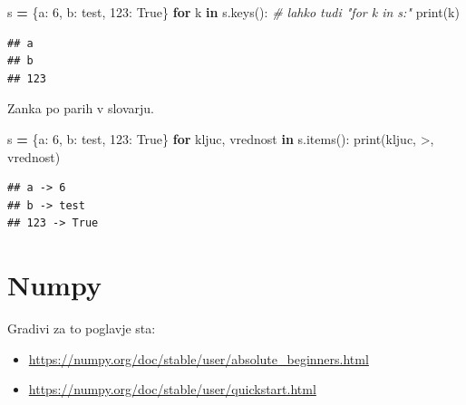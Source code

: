 \documentclass[
]{report}
\newenvironment{Shaded}{\begin{snugshade}}{\end{snugshade}}
\newcommand{\BuiltInTok}[1]{#1}
\newcommand{\CommentTok}[1]{\textcolor[rgb]{0.56,0.35,0.01}{\textit{#1}}}
\newcommand{\ControlFlowTok}[1]{\textcolor[rgb]{0.13,0.29,0.53}{\textbf{#1}}}
\newcommand{\DecValTok}[1]{\textcolor[rgb]{0.00,0.00,0.81}{#1}}
\newcommand{\KeywordTok}[1]{\textcolor[rgb]{0.13,0.29,0.53}{\textbf{#1}}}
\newcommand{\NormalTok}[1]{#1}
\newcommand{\OperatorTok}[1]{\textcolor[rgb]{0.81,0.36,0.00}{\textbf{#1}}}
\newcommand{\StringTok}[1]{\textcolor[rgb]{0.31,0.60,0.02}{#1}}
\newcommand{\VariableTok}[1]{\textcolor[rgb]{0.00,0.00,0.00}{#1}}
\providecommand{\tightlist}{%
  \setlength{\itemsep}{0pt}\setlength{\parskip}{0pt}}
\begin{document}
\begin{Shaded}
\begin{Highlighting}[]
\NormalTok{s }\OperatorTok{=}\NormalTok{ \{}\StringTok{\textquotesingle{}a\textquotesingle{}}\NormalTok{: }\DecValTok{6}\NormalTok{, }\StringTok{\textquotesingle{}b\textquotesingle{}}\NormalTok{: }\StringTok{\textquotesingle{}test\textquotesingle{}}\NormalTok{, }\DecValTok{123}\NormalTok{: }\VariableTok{True}\NormalTok{\}}
\ControlFlowTok{for}\NormalTok{ k }\KeywordTok{in}\NormalTok{ s.keys(): }\CommentTok{\# lahko tudi "for k in s:"}
    \BuiltInTok{print}\NormalTok{(k)}
\end{Highlighting}
\end{Shaded}

\begin{verbatim}
## a
## b
## 123
\end{verbatim}

Zanka po parih v slovarju.

\begin{Shaded}
\begin{Highlighting}[]
\NormalTok{s }\OperatorTok{=}\NormalTok{ \{}\StringTok{\textquotesingle{}a\textquotesingle{}}\NormalTok{: }\DecValTok{6}\NormalTok{, }\StringTok{\textquotesingle{}b\textquotesingle{}}\NormalTok{: }\StringTok{\textquotesingle{}test\textquotesingle{}}\NormalTok{, }\DecValTok{123}\NormalTok{: }\VariableTok{True}\NormalTok{\}}
\ControlFlowTok{for}\NormalTok{ kljuc, vrednost }\KeywordTok{in}\NormalTok{ s.items():}
    \BuiltInTok{print}\NormalTok{(kljuc, }\StringTok{\textquotesingle{}{-}\textgreater{}\textquotesingle{}}\NormalTok{, vrednost)}
\end{Highlighting}
\end{Shaded}

\begin{verbatim}
## a -> 6
## b -> test
## 123 -> True
\end{verbatim}

\hypertarget{numpy}{%
\chapter{Numpy}\label{numpy}}

Gradivi za to poglavje sta:

\begin{itemize}
\tightlist
\item
  \url{https://numpy.org/doc/stable/user/absolute_beginners.html}
\item
  \url{https://numpy.org/doc/stable/user/quickstart.html}
\end{itemize}
\end{document}
